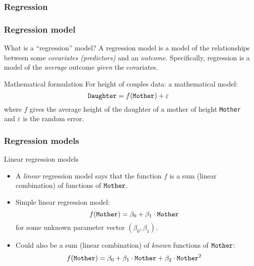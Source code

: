 \documentclass[handout]{beamer}
\begin{document}
   \begin{frame}
   \frametitle{Regression}
   \begin{center}
   \end{center}

   \end{frame}


   \begin{frame} \frametitle{Regression model}

   \begin{block}
   {What is a ``regression'' model? }
   A regression model is a model of the relationships between some {\em covariates (predictors)} and an {\em outcome}.
   Specifically, regression is a model of the {\em average} outcome {\em given}
   the covariates.
   \end{block}
   \begin{block}
   {Mathematical formulation}
   For height of couples data:
   a mathematical  model:
   $$
   {\tt Daughter} = f({\tt Mother}) + \varepsilon$$
   where $f$ gives the average height of the daughter of a mother of height {\tt Mother} and
   $\varepsilon$ is the random error.
   \end{block}
   \end{frame}


   \begin{frame} \frametitle{Regression models}

   \begin{block}
   {Linear regression models}
   \begin{itemize}
   \item A {\em linear} regression model says that
   the function $f$ is a sum (linear combination) of functions of ${\tt Mother}$.

   \item Simple linear regression model:
   $$f({\tt Mother}) = \beta_0 + \beta_1 \cdot {\tt Mother}$$
   for some unknown parameter vector $(\beta_0, \beta_1)$.
   \item Could also be a sum (linear combination) of {\em known} functions of ${\tt Mother}$:
   $$f({\tt Mother}) = \beta_0 + \beta_1 \cdot {\tt Mother} + \beta_2 \cdot {\tt Mother}^2
   $$
   \end{itemize}
   \end{block}
   \end{frame}
\end{document}
